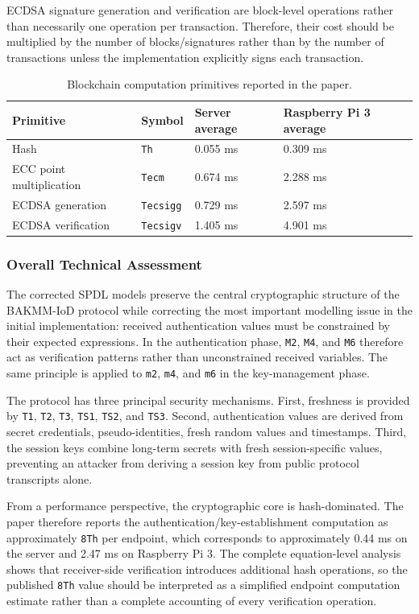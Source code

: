 ECDSA signature generation and verification are block-level operations rather
than necessarily one operation per transaction. Therefore, their cost should
be multiplied by the number of blocks/signatures rather than by the number of
transactions unless the implementation explicitly signs each transaction.

\begin{table}[ht]
\centering
\caption{Blockchain computation primitives reported in the paper.}
\label{tab:bakmm-blockchain-cost}
\begin{tabular}{llll}
\toprule
Primitive & Symbol & Server average & Raspberry Pi 3 average \\
\midrule
Hash & \texttt{Th} & 0.055 ms & 0.309 ms \\
ECC point multiplication & \texttt{Tecm} & 0.674 ms & 2.288 ms \\
ECDSA generation & \texttt{Tecsigg} & 0.729 ms & 2.597 ms \\
ECDSA verification & \texttt{Tecsigv} & 1.405 ms & 4.901 ms \\
\bottomrule
\end{tabular}
\end{table}

\subsubsection{Overall Technical Assessment}

The corrected SPDL models preserve the central cryptographic structure of the
BAKMM-IoD protocol while correcting the most important modelling issue in the
initial implementation: received authentication values must be constrained by
their expected expressions. In the authentication phase, \texttt{M2},
\texttt{M4}, and \texttt{M6} therefore act as verification patterns rather than
unconstrained received variables. The same principle is applied to
\texttt{m2}, \texttt{m4}, and \texttt{m6} in the key-management phase.

The protocol has three principal security mechanisms. First, freshness is
provided by \texttt{T1}, \texttt{T2}, \texttt{T3}, \texttt{TS1}, \texttt{TS2},
and \texttt{TS3}. Second, authentication values are derived from secret
credentials, pseudo-identities, fresh random values and timestamps. Third, the
session keys combine long-term secrets with fresh session-specific values,
preventing an attacker from deriving a session key from public protocol
transcripts alone.

From a performance perspective, the cryptographic core is hash-dominated. The
paper therefore reports the authentication/key-establishment computation as
approximately \texttt{8Th} per endpoint, which corresponds to approximately
0.44 ms on the server and 2.47 ms on Raspberry Pi 3. The complete equation-level
analysis shows that receiver-side verification introduces additional hash
operations, so the published \texttt{8Th} value should be interpreted as a
simplified endpoint computation estimate rather than a complete accounting of
every verification operation.

